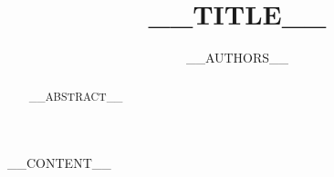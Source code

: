 \documentclass{default}
\begin{document}
\journalheader

\title{__TITLE__}
\author{__AUTHORS__}
\date{}
\maketitle

\begin{abstract}
__ABSTRACT__
\end{abstract}

__CONTENT__
\end{document}
